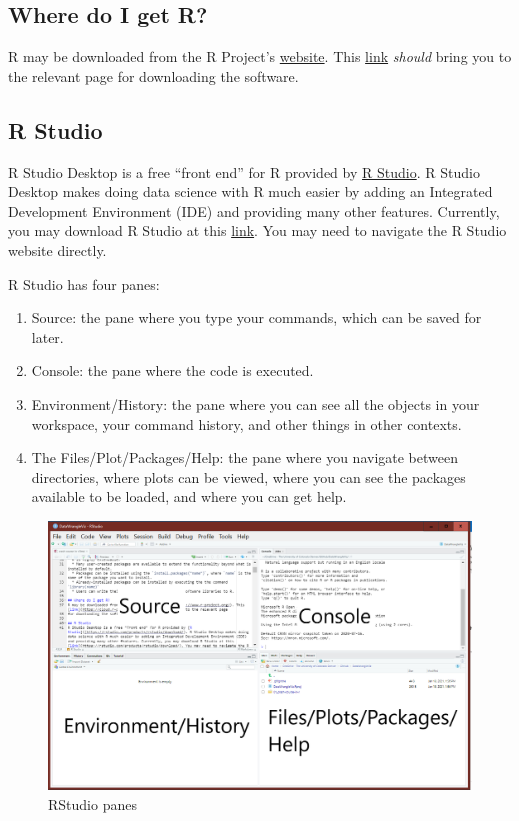 \documentclass[
]{article}
\providecommand{\tightlist}{%
  \setlength{\itemsep}{0pt}\setlength{\parskip}{0pt}}
\begin{document}
\hypertarget{where-do-i-get-r}{%
\subsection{Where do I get R?}\label{where-do-i-get-r}}

R may be downloaded from the R Project's
\href{https://www.r-project.org/}{website}. This
\href{https://cloud.r-project.org/}{link} \emph{should} bring you to the
relevant page for downloading the software.

\hypertarget{r-studio}{%
\subsection{R Studio}\label{r-studio}}

R Studio Desktop is a free ``front end'' for R provided by
\href{https://rstudio.com/}{R Studio}. R Studio Desktop makes doing data
science with R much easier by adding an Integrated Development
Environment (IDE) and providing many other features. Currently, you may
download R Studio at this
\href{https://rstudio.com/products/rstudio/download/}{link}. You may
need to navigate the R Studio website directly.

R Studio has four panes:

\begin{enumerate}
\def\labelenumi{\arabic{enumi}.}
\tightlist
\item
  Source: the pane where you type your commands, which can be saved for
  later.
\item
  Console: the pane where the code is executed.
\item
  Environment/History: the pane where you can see all the objects in
  your workspace, your command history, and other things in other
  contexts.
\item
  The Files/Plot/Packages/Help: the pane where you navigate between
  directories, where plots can be viewed, where you can see the packages
  available to be loaded, and where you can get help.
\end{enumerate}

\begin{figure}
\centering
\includegraphics{rstudio_panes.png}
\caption{RStudio panes}
\end{figure}
\end{document}
